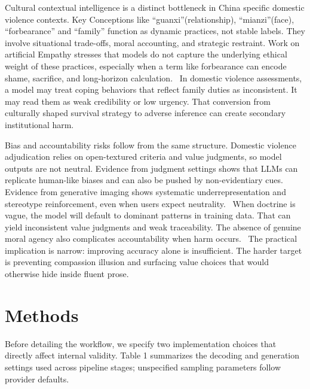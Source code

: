 \documentclass[pdflatex,sn-mathphys-ay]{sn-jnl}%
\theoremstyle{thmstyleone}%
\theoremstyle{thmstyletwo}%
\theoremstyle{thmstylethree}%
\begin{document}
Cultural contextual intelligence is a distinct bottleneck in China specific domestic violence contexts. Key Conceptions like ``guanxi''(relationship), ``mianzi''(face), ``forbearance'' and ``family'' function as dynamic practices, not stable labels. They involve situational trade-offs, moral accounting, and strategic restraint. Work on artificial Empathy stresses that models do not capture the underlying ethical weight of these practices, especially when a term like forbearance can encode shame, sacrifice, and long-horizon calculation.~\cite{cui_study_2022} In domestic violence assessments, a model may treat coping behaviors that reflect family duties as inconsistent. It may read them as weak credibility or low urgency. That conversion from culturally shaped survival strategy to adverse inference can create secondary institutional harm.

Bias and accountability risks follow from the same structure. Domestic violence adjudication relies on open-textured criteria and value judgments, so model outputs are not neutral. Evidence from judgment settings shows that LLMs can replicate human-like biases and can also be pushed by non-evidentiary cues.~\cite{sun_large_2025-2} Evidence from generative imaging shows systematic underrepresentation and stereotype reinforcement, even when users expect neutrality.~\cite{messingschlager_algorithmic_2025} When doctrine is vague, the model will default to dominant patterns in training data. That can yield inconsistent value judgments and weak traceability. The absence of genuine moral agency also complicates accountability when harm occurs.~\cite{shteynberg_does_2024-1} The practical implication is narrow: improving accuracy alone is insufficient. The harder target is preventing compassion illusion and surfacing value choices that would otherwise hide inside fluent prose.

\section{Methods}\label{sec3}

Before detailing the workflow, we specify two implementation choices that directly affect internal validity. Table 1 summarizes the decoding and generation settings used across pipeline stages; unspecified sampling parameters follow provider defaults.
\end{document}
